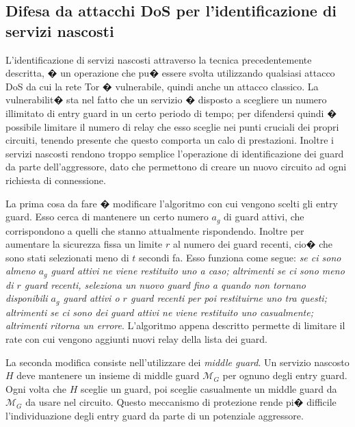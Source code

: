 \subsection{Difesa da attacchi DoS per l'identificazione di servizi nascosti}
L'identificazione di servizi nascosti attraverso la tecnica precedentemente descritta, � un operazione che pu� essere svolta utilizzando qualsiasi attacco DoS da cui la rete Tor � vulnerabile, quindi anche un attacco classico. 
La vulnerabilit� sta nel fatto che un servizio � disposto a scegliere un numero illimitato di entry guard in un certo periodo di tempo; per difendersi quindi � possibile limitare il numero di relay che esso sceglie nei punti cruciali dei propri circuiti, tenendo presente che questo comporta un calo di prestazioni. Inoltre i servizi nascosti rendono troppo semplice l'operazione di identificazione dei guard da parte dell'aggressore, dato che permettono di creare un nuovo circuito ad ogni richiesta di connessione. 

La prima cosa da fare � modificare l'algoritmo con cui vengono scelti gli entry guard. Esso cerca di mantenere un certo numero $a_{g}$ di guard attivi, che corrispondono a quelli che stanno attualmente rispondendo. Inoltre per aumentare la sicurezza fissa un limite $r$ al numero dei guard recenti, cio� che sono stati selezionati meno di $t$ secondi fa. Esso funziona come segue: \emph{se ci sono almeno $a_{g}$ guard attivi ne viene restituito uno a caso; altrimenti se ci sono meno di $r$ guard recenti, seleziona un nuovo guard fino a quando non tornano disponibili $a_{g}$ guard attivi o $r$ guard recenti per poi restituirne uno tra questi; altrimenti se ci sono dei guard attivi ne viene restituito uno casualmente; altrimenti ritorna un errore}. L'algoritmo appena descritto permette di limitare il rate con cui vengono aggiunti nuovi relay della lista dei guard.

La seconda modifica consiste nell'utilizzare dei \emph{middle guard}. Un servizio nascosto $H$ deve mantenere un insieme di middle guard $\mathcal{M}_G$ per ognuno degli entry guard. Ogni volta che $H$ sceglie un guard, poi sceglie casualmente un middle guard da $\mathcal{M}_G$ da usare nel circuito. Questo meccanismo di protezione rende pi� difficile l'individuazione degli entry guard da parte di un potenziale aggressore.


